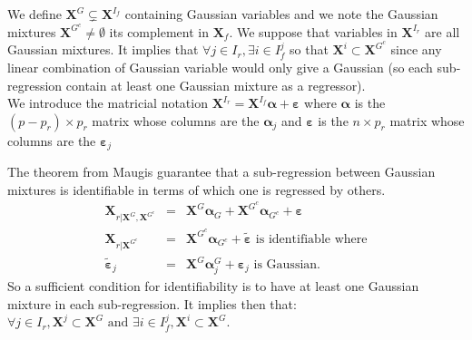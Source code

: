 \documentclass[12pt,a4paper]{report}
\begin{document}
	
We define $\boldsymbol{X}^G \subsetneq \boldsymbol{X}^{I_f}$ containing Gaussian variables and we note the Gaussian mixtures $\boldsymbol{X}^{G^c}\neq \emptyset$ its complement in $\boldsymbol{X}_f$.
We suppose that variables in $\boldsymbol{X}^{I_r}$ are all Gaussian mixtures. It implies that $\forall j  \in I_r,\exists i \in I_f^j $ so that $\boldsymbol{X}^i \subset \boldsymbol{X}^{G^c} $ since any linear combination of Gaussian variable would only give a Gaussian (so each sub-regression contain at least one Gaussian mixture as a regressor).
\\
	We introduce the matricial notation
		$\boldsymbol{X}^{I_r}=\boldsymbol{X}^{I_f}\boldsymbol{\alpha} + \boldsymbol{\varepsilon}$ where
		 $\boldsymbol{\alpha}$ is the $(p-p_r)\times p_r$ matrix whose columns are the $\boldsymbol{\alpha}_j$ and $\boldsymbol{\varepsilon}$ is the $n\times p_r$ matrix whose columns are the $\boldsymbol{\varepsilon}_j$
		
The theorem from Maugis guarantee that a sub-regression between Gaussian mixtures is identifiable in terms of which one is regressed by others.
		\begin{eqnarray}
		 \boldsymbol{X}_{r|\boldsymbol{X}^G,\boldsymbol{X}^{G^c}}&=& \boldsymbol{X}^G\boldsymbol{\alpha}_G+\boldsymbol{X}^{G^c}\boldsymbol{\alpha}_{G^c}+ \boldsymbol{\varepsilon} \\
			\boldsymbol{X}_{r|\boldsymbol{X}^{G^c}}&=& \boldsymbol{X}^{G^c}\boldsymbol{\alpha}_{G^c} + \tilde{\boldsymbol{\varepsilon}} \textrm{ is identifiable where} \\
			\tilde{\boldsymbol{\varepsilon}}_j&=&\boldsymbol{X}^{G}\boldsymbol{\alpha}_j^{G}+ \boldsymbol{\varepsilon}_j \textrm{ is Gaussian.}  
		\end{eqnarray}
		So a sufficient condition for identifiability is to have at least one Gaussian mixture in each sub-regression.	
		It implies then that: $\forall j \in I_r, \boldsymbol{X}^{j} \subset \boldsymbol{X}^G \textrm{ and } \exists i \in I_f^j,\boldsymbol{X}^{i} \subset \boldsymbol{X}^G $.  
	
\end{document}
